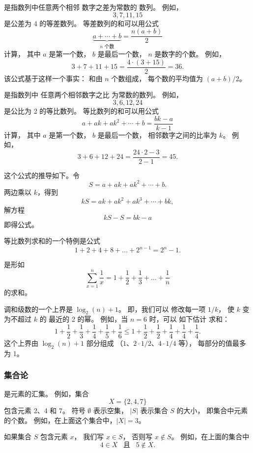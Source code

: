 是指数列中任意两个相邻
数字之差为常数的
数列。
例如，
\[3, 7, 11, 15\]
是公差为 4 的等差数列。
等差数列的和可以用公式
\[\underbrace{a + \cdots + b}_{n \,\, \textrm{个数}} = \frac{n(a+b)}{2}\]
计算，
其中 $a$ 是第一个数，
$b$ 是最后一个数，
$n$ 是数字的个数。
例如，
\[3+7+11+15=\frac{4 \cdot (3+15)}{2} = 36.\]
该公式基于这样一个事实：
和由 $n$ 个数组成，
每个数的平均值为 $(a+b)/2$。

是指数列中
任意两个相邻数字之比
为常数的数列。
例如，
\[3,6,12,24\]
是公比为 2 的等比数列。
等比数列的和可以用公式
\[a + ak + ak^2 + \cdots + b = \frac{bk-a}{k-1}\]
计算，
其中 $a$ 是第一个数，
$b$ 是最后一个数，
相邻数字之间的比率为 $k$。
例如，
\[3+6+12+24=\frac{24 \cdot 2 - 3}{2-1} = 45.\]

这个公式的推导如下。令
\[ S = a + ak + ak^2 + \cdots + b .\]
两边乘以 $k$，得到
\[ kS = ak + ak^2 + ak^3 + \cdots + bk,\]
解方程
\[ kS-S = bk-a\]
即得公式。

等比数列求和的一个特例是公式
\[1+2+4+8+\ldots+2^{n-1}=2^n-1.\]


是形如
\[ \sum_{x=1}^n \frac{1}{x} = 1+\frac{1}{2}+\frac{1}{3}+\ldots+\frac{1}{n}\]
的求和。

调和级数的一个上界是 $\log_2(n)+1$。
即，我们可以
修改每一项 $1/k$，
使 $k$ 变为不超过 $k$ 的
最近的 2 的幂。
例如，当 $n=6$ 时，可以
如下估计
求和：
\[ 1+\frac{1}{2}+\frac{1}{3}+\frac{1}{4}+\frac{1}{5}+\frac{1}{6} \le
1+\frac{1}{2}+\frac{1}{2}+\frac{1}{4}+\frac{1}{4}+\frac{1}{4}.\]
这个上界由 $\log_2(n)+1$ 部分组成
（$1$、$2 \cdot 1/2$、$4 \cdot 1/4$ 等），
每部分的值最多为 1。

\subsubsection{集合论}


是元素的汇集。
例如，集合
\[X=\{2,4,7\}\]
包含元素 2、4 和 7。
符号 $\emptyset$ 表示空集，
$|S|$ 表示集合 $S$ 的大小，
即集合中元素的个数。
例如，在上面这个集合中，$|X|=3$。

如果集合 $S$ 包含元素 $x$，
我们写 $x \in S$，
否则写 $x \notin S$。
例如，在上面的集合中
\[4 \in X \hspace{10pt}\textrm{且}\hspace{10pt} 5 \notin X.\]

